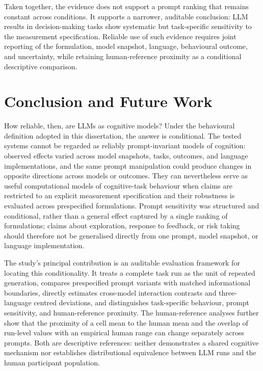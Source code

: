 \documentclass[logo,msc]{infthesis}
\begin{document}
Taken together, the evidence does not support a prompt ranking that remains constant across conditions. It supports a narrower, auditable conclusion: LLM results in decision-making tasks show systematic but task-specific sensitivity to the measurement specification. Reliable use of such evidence requires joint reporting of the formulation, model snapshot, language, behavioural outcome, and uncertainty, while retaining human-reference proximity as a conditional descriptive comparison.

\chapter{Conclusion and Future Work}
\label{sec:conclusion}

How reliable, then, are LLMs as cognitive models? Under the behavioural definition adopted in this dissertation, the answer is conditional. The tested systems cannot be regarded as reliably prompt-invariant models of cognition: observed effects varied across model snapshots, tasks, outcomes, and language implementations, and the same prompt manipulation could produce changes in opposite directions across models or outcomes. They can nevertheless serve as useful computational models of cognitive-task behaviour when claims are restricted to an explicit measurement specification and their robustness is evaluated across prespecified formulations. Prompt sensitivity was structured and conditional, rather than a general effect captured by a single ranking of formulations; claims about exploration, response to feedback, or risk taking should therefore not be generalised directly from one prompt, model snapshot, or language implementation.

The study's principal contribution is an auditable evaluation framework for locating this conditionality. It treats a complete task run as the unit of repeated generation, compares prespecified prompt variants with matched informational boundaries, directly estimates cross-model interaction contrasts and three-language centred deviations, and distinguishes task-specific behaviour, prompt sensitivity, and human-reference proximity. The human-reference analyses further show that the proximity of a cell mean to the human mean and the overlap of run-level values with an empirical human range can change separately across prompts. Both are descriptive references: neither demonstrates a shared cognitive mechanism nor establishes distributional equivalence between LLM runs and the human participant population.
\end{document}
